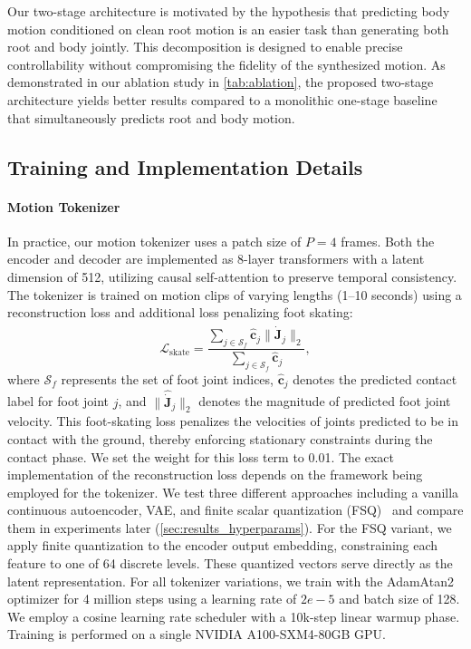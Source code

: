 Our two-stage architecture is motivated by the hypothesis that predicting body motion conditioned on clean root motion is an easier task than generating both root and body jointly.
This decomposition is designed to enable precise controllability without compromising the fidelity of the synthesized motion. As demonstrated in our ablation study in \cref{tab:ablation}, the proposed two-stage architecture yields better results compared to a monolithic one-stage baseline that simultaneously predicts root and body motion.

\subsection{Training and Implementation Details}
\label{sec:impl_details}
\paragraph{Motion Tokenizer}
In practice, our motion tokenizer uses a patch size of $P = 4$ frames. Both the encoder and decoder are implemented as 8-layer transformers with a latent dimension of 512, utilizing causal self-attention to preserve temporal consistency.
The tokenizer is trained on motion clips of varying lengths (1–10 seconds) using a reconstruction loss and additional loss penalizing foot skating:
\begin{equation}
    \mathcal{L}_{\text{skate}} = \frac{\sum_{j \in \mathcal{S}_f} \hat{\mathbf{c}}_j \| \hat{\dot{\mathbf{J}}}_{j} \|_2}{\sum_{j \in \mathcal{S}_f}  \hat{\mathbf{c}}_j },
\end{equation}
where $\mathcal{S}_f$ represents the set of foot joint indices, $\hat{\mathbf{c}}_j$ denotes the predicted contact label for foot joint $j$, and $\| \hat{\dot{\mathbf{J}}}_{j} \|_2$ denotes the magnitude of predicted foot joint velocity. This foot-skating loss penalizes the velocities of joints predicted to be in contact with the ground, thereby enforcing stationary constraints during the contact phase. We set the weight for this loss term to 0.01.
The exact implementation of the reconstruction loss depends on the framework being employed for the tokenizer. We test three different approaches including a vanilla continuous autoencoder, VAE, and finite scalar quantization (FSQ)~\cite{mentzer2023finite} and compare them in experiments later (\cref{sec:results_hyperparams}). 
For the FSQ variant, we apply finite quantization to the encoder output embedding, constraining each feature to one of 64 discrete levels. These quantized vectors serve directly as the latent representation.
For all tokenizer variations, we train with the AdamAtan2~\cite{everett2024scaling} optimizer for 4 million steps using a learning rate of $2e{-}5$ and batch size of 128. We employ a cosine learning rate scheduler with a 10k-step linear warmup phase. Training is performed on a single NVIDIA A100-SXM4-80GB GPU. 


